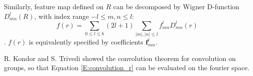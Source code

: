 \documentclass{article}
\begin{document}
Similarly, feature map defined on $R$ can be decomposed by Wigner D-function $D_{mn}^l(R)$,
with index range $-l \leq m,n \leq l$:
\begin{equation}
    f(r) = \sum_{0\leq l \leq b} (2l+1) \sum_{|m|,|n|\leq l} f_{mn}^l D_{mn}^l(r)
    \label{E:so3_fft}
\end{equation}.
$f(r)$ is equivalently specified by coefficients $\mathbf{f}_{mn}^l$.

R. Kondor and S. Trivedi showed the convolution theorem for convolution on groups, so that Equation \eqref{E:convolution_r} can be 
evaluated on the fourier space.


\begin{comment}
We define the transformation of the feature map as by rotation operator $L_R$. The transformed feature map is given 
by
\begin{equation}
    [L_R f](x) = f(R^{-1}x)
\end{equation}
Now, it is not possible to define convolution (correlation) as summations, as in Equation.\eqref{E:G-correlation}, 
because the group of rotation is continous. The natural extensio for continuous variable is given by inner product. 
For first layer that operate on the spherical image:
\begin{equation}
    [f \star \psi] (R) = \langle L_R \psi, f \rangle = \int_{S^2} \sum_{k=1}^{K^l} \psi_k(R^{-1}x) f_k(x) dx
\end{equation}

All later feature maps are function $f\colon SO(3)\to \mathbb{R}^K$. For $R, Q \in SO(3)$ we have:
\begin{equation}
    [L_R f](Q) = f(R^{-1}Q)
\end{equation}
and 
\begin{equation}
    [f \star \psi] (R) = \langle L_R \psi, f \rangle = \int_{SO(3)} \sum_{k=1}^{K^l} \psi_k(R^{-1}Q) f_k(Q) dQ
\end{equation}
where $\int_{SO(3)}$ can be expressed by $\int\int\int d\alpha d\beta d\gamma$. There equation follow 
Proposition.\ref{Prop:G-correlation} and therefore is equivariant with respect to transformations in the group.


\subsection*{Group equivariant CNN in Fourier transform}
For the calculation of convolution, it is convenient to use generalized fourier transformation. 
For any function on a sphere, we can define the fourier transformation and inverse transformation by:
\begin{align}
    f(x) &= \sum_{0\leq l \leq b} \sum_{|m|\leq l} f_m^l Y_m^l(x) &  f_m^l &= \sum_{S^2} \overline{Y_m^l(x)} f(x) dx  
\end{align}
with $Y_m^l(x)$ the spherical harmonics and $b$ the bandwidth of the decomposition. 
Similarly, any function on $R$ can be decomposed by Wigner D-function $D_{mn}^l(R)$,
with index range $-l \leq m,n \leq l$:
\begin{equation}
    f(R) = \sum_{0\leq l \leq b} (2l+1) \sum_{|m|,|n|\leq l} f_{mn}^l D_{mn}^l(R)
    \label{E:so3_fft}
\end{equation}.



\end{comment}
\end{document}
